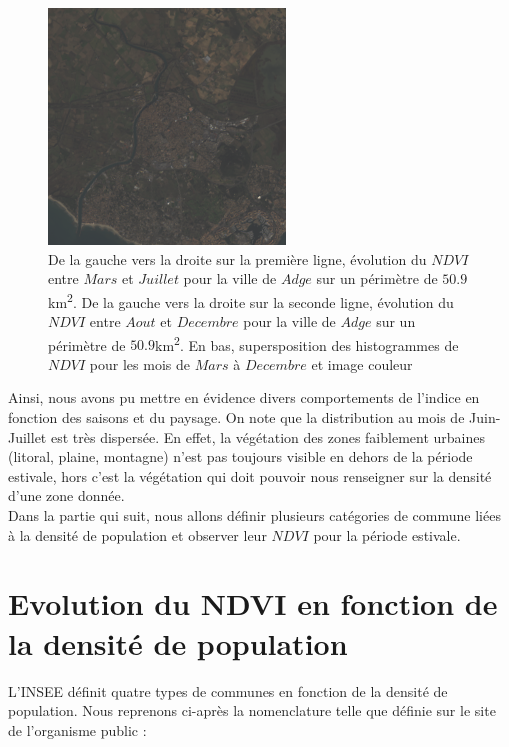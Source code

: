 \documentclass{book}
\begin{document}
\begin{figure}[H]
\begin{center}
\includegraphics[scale=0.7]{images/Agde/12_rgb.png}

\end{center}
\caption{De la gauche vers la droite sur la première ligne, évolution du $NDVI$ entre $Mars$ et $Juillet$ pour la ville de $Adge$ sur un périmètre de $50.9$km\textsuperscript{2}.
De la gauche vers la droite sur la seconde ligne, évolution du $NDVI$ entre $Aout$ et $Decembre$ pour la ville de $Adge$ sur un périmètre de $50.9$km\textsuperscript{2}. 
En bas, supersposition des histogrammes de $NDVI$ pour les mois de $Mars$ à $Decembre$ et image couleur}
\label{agde_ndvi_annee}
\end{figure}
\clearpage

Ainsi, nous avons pu mettre en évidence divers comportements de l'indice en fonction des saisons et du paysage. On note que la distribution au mois de Juin-Juillet est 
très dispersée. En effet, la végétation des zones faiblement urbaines (litoral, plaine, montagne) n'est pas toujours visible en dehors de la période estivale, hors c'est la
végétation qui doit pouvoir nous renseigner sur la densité d'une zone donnée.\\
Dans la partie qui suit, nous allons définir plusieurs catégories de commune liées à la densité de population et observer leur $NDVI$ pour la période estivale.\\

\chapter{Evolution du NDVI en fonction de la densité de population}

L'INSEE définit quatre types de communes en fonction de la densité de population. Nous reprenons ci-après la nomenclature telle que définie sur le
site de l'organisme public \cite{insee}:\\
\end{document}
